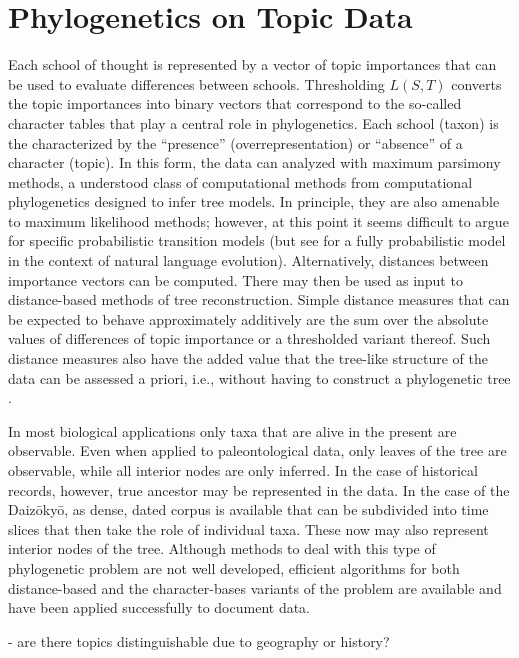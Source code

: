 \documentclass[a4paper,10pt]{article}
\newcommand{\TODO}[1]{\begingroup\color{red}#1\endgroup}
\begin{document}
\section{Phylogenetics on Topic Data} 

Each school of thought is represented by a vector of topic importances that can
be used to evaluate differences between schools. Thresholding
$L(S,T)$ converts the topic importances into binary vectors that correspond
to the so-called character tables that play a central role in
phylogenetics. Each school (taxon) is the characterized by the
``presence'' (overrepresentation) or ``absence'' of a character (topic).
In this form, the data can analyzed with maximum parsimony methods, a
understood class of computational methods from computational phylogenetics
designed to infer tree models. In principle, they are also amenable to
maximum likelihood methods; however, at this point it seems difficult to
argue for specific probabilistic transition models (but see
\cite{Hruschka:15} for a fully probabilistic model in the context of
natural language evolution). Alternatively, distances between importance
vectors can be computed. There may then be used as input to distance-based
methods of tree reconstruction. Simple distance measures that can be
expected to behave approximately additively are the sum over the absolute
values of differences of topic importance or a thresholded variant
thereof. Such distance measures also have the added value that the
tree-like structure of the data can be assessed a priori, i.e., without
having to construct a phylogenetic tree \cite{Misof:14}.

In most biological applications only taxa that are alive in the present are
observable. Even when applied to paleontological data, only leaves of the
tree are observable, while all interior nodes are only inferred. In the
case of historical records, however, true ancestor may be represented in
the data. In the case of the Daiz{\=o}ky{\=o}, as dense, dated corpus is
available that can be subdivided into time slices that then take the role
of individual taxa. These now may also represent interior nodes of the
tree. Although methods to deal with this type of phylogenetic problem are
not well developed, efficient algorithms for both distance-based and the
character-bases variants of the problem are available \cite{Telles:13} and
have been applied successfully to document data. 






\TODO{- are there topics distinguishable due to geography or history?}
\end{document}

